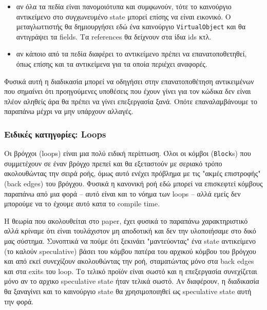 \begin{itemize}
\begin{itemize}

\item αν όλα τα πεδία είναι πανομοιότυπα και συμφωνούν, τότε το καινούργιο
αντικείμενο στο συγχωνευμένο state μπορεί επίσης να είναι εικονικό. Ο
μεταγλωττιστής θα δημιουργήσει εδώ ένα καινούργιο \texttt{VirtualObject} και θα
αντιγράψει τα fields. Τα references θα δείχνουν στα ίδια ids κτλ.

\item αν κάποιο από τα πεδία διαφέρει το αντικείμενο πρέπει να επανατοποθετηθεί,
όπως επίσης και τα αντικείμενα για τα οποία περιέχει αναφορές.

\end{itemize}
\end{itemize}

Φυσικά αυτή η διαδικασία μπορεί να οδηγήσει στην επανατοποθέτηση αντικειμένων
που σημαίνει ότι προηγούμενες υποθέσεις που έχουν γίνει για τον κώδικα δεν είναι
πλέον αληθείς άρα θα πρέπει να γίνει επεξεργασία ξανά. Οπότε επαναλαμβάνουμε το
παραπάνω μέχρι να μην υπάρχουν αλλαγές.


\subsubsection{Ειδικές κατηγορίες: Loops}

Οι βρόγχοι (loops) είναι μια πολύ ειδική περίπτωση. Όλοι οι κόμβοι
(\texttt{Block}s) που συμμετέχουν σε έναν βρόγχο πρεπεί και θα εξεταστούν με
σεριακό τρόπο ακολουθώντας την σειρά ροής, όμως αυτό ενέχει πρόβλημα με τις
"ακμές επιστροφής" (back edges) του βρόγχου. Φυσικά η κανονική ροή εδώ μπορεί να
επισκεφτεί κόμβους παραπάνω από μια φορά – αυτό είναι και το νόημα των loops –
αλλά εμείς δεν μπορούμε να το έχουμε αυτό κατα το compile time.

Η θεωρία που ακολουθείται στο paper, έχει φυσικά το παραπάνω χαρακτηριστικό αλλά
κρίναμε ότι είναι τουλάχιστον μη αποδοτική και δεν την υλοποιήσαμε στο δικό μας
σύστημα. Συνοπτικά να πούμε ότι ξεκινάει "μαντεύοντας" ένα state αντικείμενο (το
καλούν speculative) βάσει του κόμβου πατέρα του αρχικού κόμβου του βρόγχου και
από εκεί συνεχίζουν ακολουθώντας την ροή, σταματώντας μόνο στα back edges και
στα exits του loop. Το τελικό προϊόν είναι σωστό και η επεξεργασία συνεχίζεται
μόνο αν το αρχικο speculative state ήταν τελικά σωστό. Αν διαφέρουν, η
διαδικασία θα ξαναγίνει και το καινούργιο state θα χρησιμοποιηθεί ως speculative
state αυτή την φορά.

